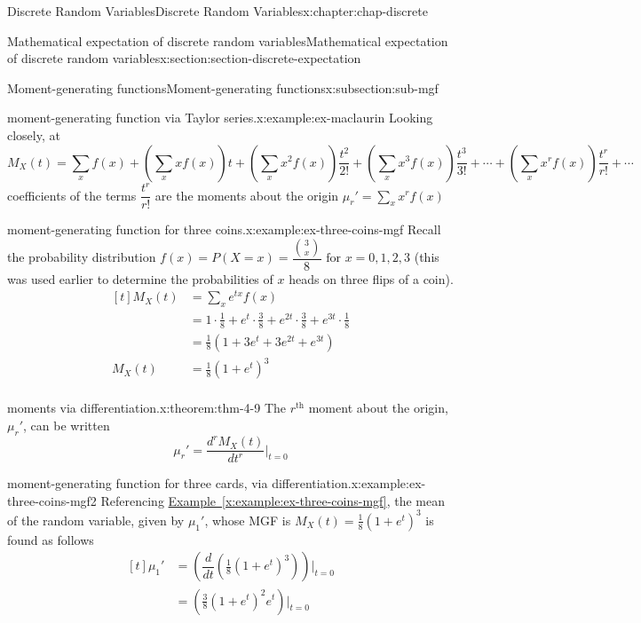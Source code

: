 \documentclass[oneside,10pt,]{book}
\newcommand{\xreffont}{\relax}
\numberwithin{equation}{section}
\newcommand{\amp}{&}
\begin{document}
\begin{chapterptx}{Discrete Random Variables}{}{Discrete Random Variables}{}{}{x:chapter:chap-discrete}
\begin{sectionptx}{Mathematical expectation of discrete random variables}{}{Mathematical expectation of discrete random variables}{}{}{x:section:section-discrete-expectation}
\begin{subsectionptx}{Moment-generating functions}{}{Moment-generating functions}{}{}{x:subsection:sub-mgf}
\begin{example}{moment-generating function via Taylor series.}{x:example:ex-maclaurin}
Looking closely, at%
\begin{equation*}
M_X(t) = \sum_xf(x) + \left(\sum_x xf(x)\right)t
+ \left(\sum_x x^2f(x)\right)\frac{t^2}{2!} + \left(\sum_x
x^3f(x)\right)\frac{t^3}{3!} + \cdots + \left(\sum_x
x^rf(x)\right)\frac{t^r}{r!} + \cdots
\end{equation*}
coefficients of the terms \(\displaystyle \dfrac{t^r}{r!}\) are the moments about the origin \(\displaystyle \mu_r' = \sum_x x^r f(x)\)%
\end{example}
\begin{example}{moment-generating function for three coins.}{x:example:ex-three-coins-mgf}%
Recall the probability distribution \(f(x) = P(X = x) =
\dfrac{{3\choose x}}{8} \text{ for } x = 0, 1, 2, 3\) (this was used earlier to determine the probabilities of \(x\) heads on three flips of a coin).%
\begin{equation*}
\begin{aligned}[t]
M_X(t) \amp = \sum_x e^{tx} f(x)\\
\amp = 1 \cdot \frac{1}{8} + e^{t} \cdot \frac{3}{8}+ e^{2t} \cdot
\frac{3}{8} + e^{3t} \cdot \frac{1}{8}\\
\amp = \frac{1}{8} \left(1 + 3e^{t} + 3e^{2t} + e^{3t}\right)\\
M_X(t) \amp = \frac{1}{8} (1+e^t)^3\\
\end{aligned}
\end{equation*}
%
\end{example}
\begin{theorem}{moments via differentiation.}{}{x:theorem:thm-4-9}%
The \(r^\text{th}\) moment about the origin, \(\mu_r'\), can be written%
\begin{equation*}
\displaystyle \mu_r' = \dfrac{d^rM_X(t)}{dt^r}\Big|_{t=0}
\end{equation*}
%
\end{theorem}
\begin{example}{moment-generating function for three cards, via differentiation.}{x:example:ex-three-coins-mgf2}%
Referencing \hyperref[x:example:ex-three-coins-mgf]{Example~{\xreffont\ref{x:example:ex-three-coins-mgf}}}, the mean of the random variable, given by \(\mu_1'\), whose MGF is \(M_X(t) =
\frac{1}{8} (1+e^t)^3\) is found as follows%
\begin{equation*}
\begin{aligned}[t]
\mu_1' \amp = \left(\dfrac{d}{dt}\left(\frac{1}{8}
(1+e^t)^3\right)\right)\Big|_{t=0}\\
\amp = \left(\frac{3}{8} (1+e^t)^2e^t\right)\Big|_{t=0}\\

\end{aligned}
\end{equation*}
\end{example}
\end{subsectionptx}
\end{sectionptx}
\end{chapterptx}
\end{document}
